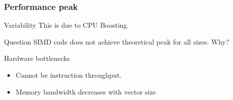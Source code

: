 \documentclass[dvipsnames,presentation,aspectratio=169,14pt]{beamer}
\begin{document}
\begin{frame}
\begin{columns}[c]
\begin{column}{0.7\textwidth}
\begin{center}
      \end{center}
    \end{column}
  \end{columns}
\end{frame}

\begin{frame}
  \frametitle{Performance peak}
  \begin{block}{Variability}
    This is due to CPU Boosting.
  \end{block}
  \pause
  \begin{challenge}{Question}
    SIMD code does not achieve theoretical peak for all sizes. Why?
  \end{challenge}
  \pause
  \begin{answer}{Hardware bottlenecks}
    \pause
    \begin{itemize}
    \item Cannot be instruction throughput.
    \item Memory bandwidth decreases with vector size
    \end{itemize}
  \end{answer}
\end{frame}
\end{document}
